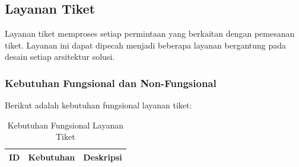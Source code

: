 \subsection{Layanan Tiket}

Layanan tiket memproses setiap permintaan yang berkaitan dengan pemesanan tiket. Layanan ini dapat dipecah menjadi beberapa layanan bergantung pada desain setiap arsitektur solusi.

\subsubsection{Kebutuhan Fungsional dan Non-Fungsional}

Berikut adalah kebutuhan fungsional layanan tiket:

\begingroup
\footnotesize
\begin{longtable}{|l|p{}|p{}|}
    \caption{Kebutuhan Fungsional Layanan Tiket}                                                                                                                                                                                                                                                                                                                                                                                                                                                                                                                                                           \\
    \hline
    \textbf{ID} & \textbf{Kebutuhan}                                                                                                                                                                                                              & \textbf{Deskripsi}                                                                                                                                                                                                                                                                                                                                    \\
    \endfirsthead


\end{longtable}

